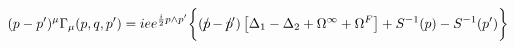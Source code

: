 \begin{equation}
(p-p')^{\mu}\Gamma_{\mu}(p,q,p')=iee^{\frac{i}{2}p\wedge
p'}\biggl\{(p\hspace{-0.2cm}/-p\hspace{-0.2cm}/')\left[\Delta_{1}-\Delta_{2}+\Omega^{\infty}+\Omega^{F}\right]
+S^{-1}(p)-S^{-1}(p')\biggr\}
\end{equation}

